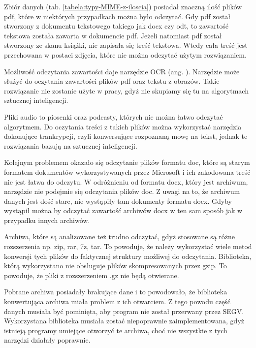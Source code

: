 Zbiór danych (tab. \ref{tabela:typy-MIME-z-iloscia}) posiadał znaczną ilość plików pdf, które w niektórych przypadkach
można było odczytać. Gdy pdf został stworzony z dokumentu tekstowego takiego
jak docx czy odt, to zawartość tekstowa została zawarta w dokumencie pdf. Jeżeli
natomiast pdf został stworzony ze skanu książki, nie zapisała się treść tekstowa.
Wtedy cała treść jest przechowana w postaci zdjęcia, które nie można odczytać użytym
rozwiązaniem.

Możliwość odczytania zawartości daje narzędzie OCR (ang. ).
Narzędzie może służyć do oczytania zawartości plików pdf oraz tekstu z obrazów.
Takie rozwiązanie nie zostanie użyte w pracy, gdyż nie skupiamy się tu na 
algorytmach sztucznej inteligencji.

Pliki audio to piosenki oraz podcasty, których nie można łatwo odczytać algorytmem.
Do oczytania treści z takich plików można wykorzystać narzędzia dokonujące 
trankrypcji, czyli konwersujące rozpoznaną mowę na tekst, jednak te rozwiązania bazują 
na sztucznej inteligencji.

Kolejnym problemem okazało się odczytanie plików formatu doc, które są starym 
formatem dokumentów wykorzystywanych przez Microsoft i ich zakodowana treść nie
jest łatwa do odczytu. W odróżnieniu od formatu docx, który jest archiwum, 
narzędzie nie podejmie się odczytania plików doc. Z uwagi na to, że archiwum danych
jest dość stare, nie wystąpiły tam dokumenty formatu docx. Gdyby wystąpił można
by odczytać zawartość archiwów docx w ten sam sposób jak w przypadku innych 
archiwów.

Archiwa, które są analizowane też trudno odczytać, gdyż stosowane są różne 
rozszerzenia np. zip, rar, 7z, tar. To powoduje, że należy wykorzystać wiele
metod konwersji tych plików do faktycznej struktury możliwej do odczytania. 
Biblioteka, którą wykorzystano nie obsługuje plików skompresowanych przez gzip.
To powoduje, że pliki z rozszerzeniem .gz nie będą otwierane.

Pobrane archiwa posiadały brakujące dane i to powodowało, że biblioteka konwertująca
archiwa miała problem z ich otwarciem. Z tego powodu część danych musiała być 
pominięta, aby program nie został przerwany przez SEGV. Wykorzystana biblioteka
musiała zostać niepoprawnie zaimplementowana, gdyż istnieją programy umiejące 
otworzyć te archiwa, choć nie wszystkie z tych narzędzi działały poprawnie. 


